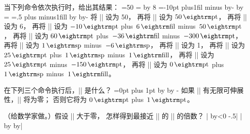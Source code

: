 \dangerexercise \1当下列命令依次执行时，给出其结果：
\begintt
{}=50   =   \divide{} by 8
=-10pt plus\count1fil minus
\multiply{} by-  \divide{} by   =
=.5 plus minus\count\count1fill
\multiply{} by   \advance{} by-
\endtt
\answer 将 || 设为 50，
再将 || 设为 $50\pt$，
再将 || 设为 6，
再将 || 设为 $-10\pt$ plus~$6\,{\rm fil}$ minus~$50\pt$，
再将 || 设为 $60\pt$ plus~$-36\,{\rm fil}$ minus~$-300\pt$，
再将 || 设为 $1\,{\rm sp}$ minus~$-6\,{\rm sp}$，
再将 || 设为 1，
再将 || 设为 $25\pt$ plus~$1\,{\rm sp}$ minus~$1\,{\rm fill}$，
再将 || 设为 $25\pt$ minus~$-150\pt$，
再将 || 设为 $0\pt$ plus~$1\,{\rm sp}$ minus~$1\,{\rm fill}$。

\dangerexercise 在下列三个命令执行后，|| 是什么？
\begintt
{}=0pt plus 1pt
\advance{} by   \advance{} by -
\endtt
\answer 如果 || 有无限可伸展性，|| 将为零；
否则它将为 $0\pt$ plus~$1\pt$。

\dangerexercise （给数学家做。）假设 || 大于零，
怎样得到最接近 || 的 || 的倍数？
\answer |\advance{} by\ifnum{}<0 -\fi.5|\parbreak
|\divide{} by \multiply{} by|


